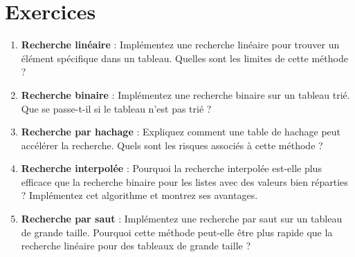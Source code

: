 \section{Exercices}


\begin{enumerate}
	\item \textbf{Recherche linéaire} : Implémentez une recherche linéaire pour trouver un élément spécifique dans un tableau. Quelles sont les limites de cette méthode ?
	\item \textbf{Recherche binaire} : Implémentez une recherche binaire sur un tableau trié. Que se passe-t-il si le tableau n'est pas trié ?
	\item \textbf{Recherche par hachage} : Expliquez comment une table de hachage peut accélérer la recherche. Quels sont les risques associés à cette méthode ?
	\item \textbf{Recherche interpolée} : Pourquoi la recherche interpolée est-elle plus efficace que la recherche binaire pour les listes avec des valeurs bien réparties ? Implémentez cet algorithme et montrez ses avantages.
	\item \textbf{Recherche par saut} : Implémentez une recherche par saut sur un tableau de grande taille. Pourquoi cette méthode peut-elle être plus rapide que la recherche linéaire pour des tableaux de grande taille ?
\end{enumerate}



